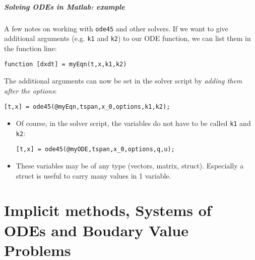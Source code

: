 \documentclass[11pt,table,final,fleqn,xcolor={usenames,dvipsnames,table}]{beamer}
\begin{document}
\begin{frame}[fragile]
  \frametitle{Solving ODEs in Matlab: example}
  A few notes on working with \lstinline$ode45$ and other solvers. If we want to give additional arguments (e.g. \lstinline$k1$ and \lstinline$k2$) to our ODE function, we can list them in the function line:
  \begin{lstlisting}
function [dxdt] = myEqn(t,x,k1,k2)
  \end{lstlisting}
  The additional arguments can now be set in the solver script by \emph{adding them after the options}:
  \begin{lstlisting}
[t,x] = ode45(@myEqn,tspan,x_0,options,k1,k2);
    \end{lstlisting}
  \pause
  \begin{itemize}
    \item Of course, in the solver script, the variables do not have to be called \lstinline$k1$ and \lstinline$k2$:
      \begin{lstlisting}
[t,x] = ode45(@myODE,tspan,x_0,options,q,u);
    \end{lstlisting}
    \item These variables may be of any type (vectors, matrix, struct). Especially a struct is useful to carry many values in 1 variable.
  \end{itemize}
\end{frame}


\part{Implicit methods, Systems of ODEs and Boudary Value Problems} 
\frame{\partpage}
\end{document}

